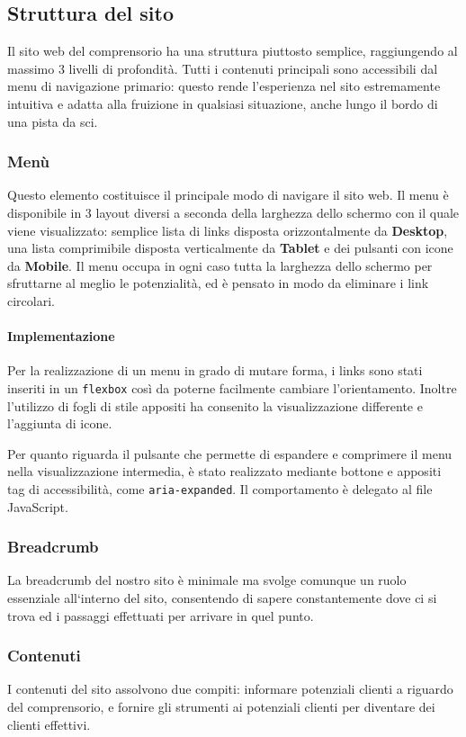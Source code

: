\subsection{Struttura del sito}
Il sito web del comprensorio ha una struttura piuttosto semplice, raggiungendo al massimo 3 livelli di profondità.
Tutti i contenuti principali sono accessibili dal menu di navigazione primario: questo rende l'esperienza nel sito estremamente intuitiva e adatta alla fruizione in qualsiasi situazione, anche lungo il bordo di una pista da sci.

\subsubsection{Menù}
Questo elemento costituisce il principale modo di navigare il sito web. Il menu è disponibile in 3 layout diversi a seconda della larghezza dello schermo con il quale viene visualizzato: semplice lista di links disposta orizzontalmente da \textbf{Desktop}, una lista comprimibile disposta verticalmente da \textbf{Tablet} e dei pulsanti con icone da \textbf{Mobile}.
Il menu occupa in ogni caso tutta la larghezza dello schermo per sfruttarne al meglio le potenzialità, ed è pensato in modo da eliminare i link circolari.
\paragraph{Implementazione}\label{MenuPrinc}
Per la realizzazione di un menu in grado di mutare forma, i links sono stati inseriti in un \verb|flexbox| così da poterne facilmente cambiare l'orientamento. Inoltre l'utilizzo di fogli di stile appositi ha consenito la visualizzazione differente e l'aggiunta di icone.

Per quanto riguarda il pulsante che permette di espandere e comprimere il menu nella visualizzazione intermedia, è stato realizzato mediante bottone e appositi tag di accessibilità, come \verb|aria-expanded|. Il comportamento è delegato al file JavaScript.
\subsubsection{Breadcrumb}
La breadcrumb del nostro sito è minimale ma svolge comunque un ruolo essenziale all`interno del sito, consentendo di sapere constantemente dove ci si trova ed i passaggi effettuati per arrivare in quel punto.
\subsubsection{Contenuti}
I contenuti del sito assolvono due compiti: informare potenziali clienti a riguardo del comprensorio, e fornire gli strumenti ai potenziali clienti per diventare dei clienti effettivi.

